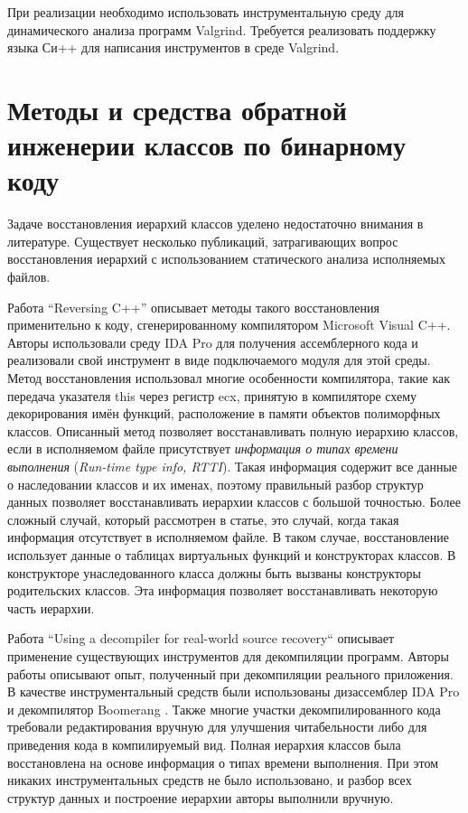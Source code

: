 \documentclass[a4paper,12pt,russian]{article}
\newcommand{\code}[1]{\textsf{#1}}
\begin{document}
При реализации необходимо использовать инструментальную среду для динамического анализа программ \code{Valgrind}.
Требуется реализовать поддержку языка Си++ для написания инструментов в среде \code{Valgrind}.

\newpage
\section{Методы и средства обратной инженерии классов по бинарному коду}
\label{reverse_eng_overview}
Задаче восстановления иерархий классов уделено недостаточно внимания в литературе.
Существует несколько публикаций, затрагивающих вопрос восстановления иерархий с использованием статического анализа исполняемых файлов.

Работа ``Reversing C++'' \cite{reversing_cpp} описывает методы такого восстановления применительно к коду, сгенерированному компилятором Microsoft Visual C++.
Авторы использовали среду IDA Pro \cite{ida_pro} для получения ассемблерного кода и реализовали свой инструмент в виде подключаемого модуля для этой среды.
Метод восстановления использовал многие особенности компилятора, такие как передача указателя \code{this} через регистр \code{ecx}, принятую в компиляторе схему декорирования имён функций, расположение в памяти объектов полиморфных классов.
Описанный метод позволяет восстанавливать полную иерархию классов, если в исполняемом файле присутствует \emph{информация о типах времени выполнения} (\emph{Run-time type info, RTTI}).
Такая информация содержит все данные о наследовании классов и их именах, поэтому правильный разбор структур данных позволяет восстанавливать иерархии классов с большой точностью.
Более сложный случай, который рассмотрен в статье, это случай, когда такая информация отсутствует в исполняемом файле.
В таком случае, восстановление использует данные о таблицах виртуальных функций и конструкторах классов.
В конструкторе унаследованного класса должны быть вызваны конструкторы родительских классов.
Эта информация позволяет восстанавливать некоторую часть иерархии.


Работа ``Using a decompiler for real-world source recovery`` \cite{real_decomp} описывает применение существующих инструментов для декомпиляции программ.
Авторы работы описывают опыт, полученный при декомпиляции реального приложения.
В качестве инструментальный средств были использованы дизассемблер IDA Pro \cite{ida_pro} и декомпилятор Boomerang \cite{boomerang}.
Также многие участки декомпилированного кода требовали редактирования вручную для улучшения читабельности либо для приведения кода в компилируемый вид.
Полная иерархия классов была восстановлена на основе информация о типах времени выполнения.
При этом никаких инструментальных средств не было использовано, и разбор всех структур данных и построение иерархии авторы выполнили вручную.
\end{document}
